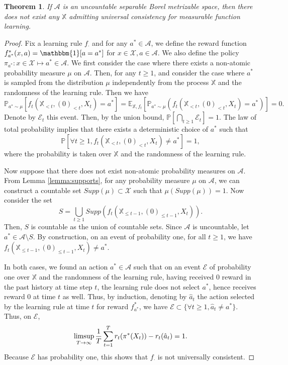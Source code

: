 \documentclass[aos]{imsart}
\theoremstyle{plain}
\newtheorem{theorem}{Theorem}[section]
\theoremstyle{remark}
\newcommand{\Acal}{\mathcal{A}}
\newcommand{\Ecal}{\mathcal{E}}
\newcommand{\Xcal}{\mathcal{X}}
\newcommand{\Ebb}{\mathbb{E}}
\newcommand{\Pbb}{\mathbb{P}}
\newcommand{\Xbb}{\mathbb{X}}
\newcommand{\1}{\mathbbm{1}}%
\newcommand{\A}{\mathcal A}
\renewcommand{\limsup}{\mathop{\rm limsup}}
\newcommand{\ProcX}{\mathbb{X}}
\begin{document}
\begin{theorem}
\label{thm:uncountable_emptyset}
If $\A$ is an uncountable separable Borel metrizable space, then there does not exist any $\ProcX$ admitting universal consistency for measurable function learning.
\end{theorem}



\begin{proof}
Fix a learning rule $f_\cdot$ and for any $a^*\in\Acal$, we define the reward function $f_{a^*}^*(x,a) = \1[a=a^*]$ for $x\in\Xcal,a\in\Acal$. We also define the policy $\pi_{a^*}:x\in\Xcal\mapsto a^*\in\Acal$. We first consider the case where there exists a non-atomic probability measure $\mu$ on $\Acal$. Then, for any $t\geq 1$, and consider the case where $a^*$ is sampled from the distribution $\mu$ independently from the process $\Xbb$ and the randomness of the learning rule. Then we have
\begin{equation*}
    \Pbb_{a^*\sim \mu}[f_t(\Xbb_{<t},(0)_{<t},X_t) = a^*] = \Ebb_{\Xbb,f_t}[\Pbb_{a^*\sim\mu}(f_t(\Xbb_{<t},(0)_{<t},X_t) = a^*)]=0.
\end{equation*}
Denote by $\Ecal_t$ this event. Then, by the union bound, $\Pbb[\bigcap_{t\geq 1}\Ecal_t]=1$. The law of total probability implies that there exists a deterministic choice of $a^*$ such that
\begin{equation*}
    \Pbb[\forall t\geq 1,f_t(\Xbb_{<t},(0)_{<t},X_t) \neq a^*]=1,
\end{equation*}
where the probability is taken over $\Xbb$ and the randomness of the learning rule.

Now suppose that there does not exist non-atomic probability measures on $\Acal$. From Lemma \ref{lemma:supports}, for any probability measure $\mu$ on $\Acal$, we can construct a countable set $Supp(\mu)\subset\Xcal$ such that $\mu(Supp(\mu))=1$. Now consider the set
\begin{equation*}
    S = \bigcup_{t\geq 1}  Supp(f_t(\Xbb_{\leq t-1}, (0)_{\leq t-1}, X_t)).
\end{equation*}
Then, $S$ is countable as the union of countable sets. Since $\Acal$ is uncountable, let $a^*\in \Acal\setminus S$. By construction, on an event of probability one, for all $t\geq 1$, we have $f_t(\Xbb_{\leq t-1}, (0)_{\leq t-1}, X_t)\neq a^*$.


In both cases, we found an action $a^*\in\Acal$ such that on an event $\Ecal$ of probability one over $\Xbb$ and the randomness of the learning rule, having received 0 reward in the past history at time step $t$, the learning rule does not select $a^*$, hence receives reward 0 at time $t$ as well. Thus, by induction, denoting by $\hat a_t$ the action selected by the learning rule at time $t$ for reward $f_{a^*}^*$, we have $ \Ecal\subset\{\forall t\geq 1, \hat a_t\neq a^*\}.$ Thus, on $\Ecal$,
\begin{equation*}
    \limsup_{T\to\infty}\frac{1}{T}\sum_{t=1}^T r_t(\pi^*(X_t))-r_t(\hat a_t) = 1.
\end{equation*}
Because $\Ecal$ has probability one, this shows that $f_\cdot$ is not universally consistent.
\end{proof}
\end{document}
